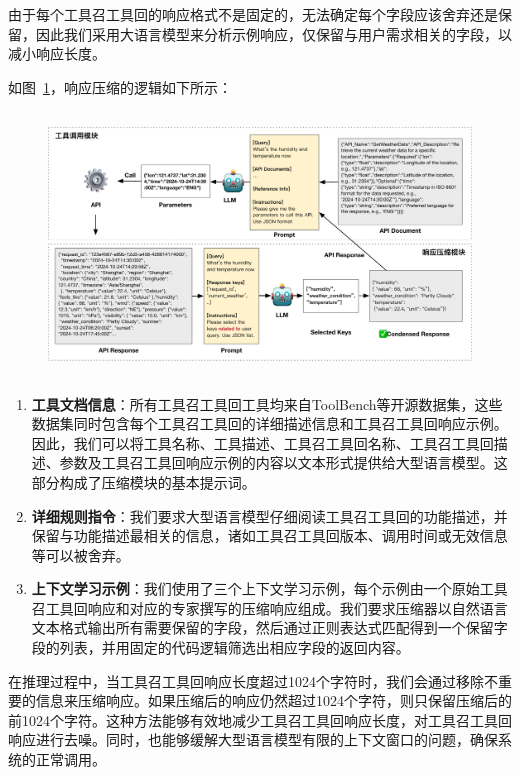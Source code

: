 由于每个工具召工具回的响应格式不是固定的，无法确定每个字段应该舍弃还是保留，因此我们采用大语言模型来分析示例响应，仅保留与用户需求相关的字段，以减小响应长度。

如图~\ref{fig:ch4-compression}，响应压缩的逻辑如下所示：

\begin{figure}[!htp]
  \vspace{1em}
  \centering
  \setlength{\abovecaptionskip}{10pt} %
  \includegraphics[height=7cm]{../assets/ch4-工具调用模块.pdf}
  \label{fig:ch4-compression}
\end{figure}

\begin{enumerate}
    \item \textbf{工具文档信息}：所有工具召工具回工具均来自ToolBench等开源数据集，这些数据集同时包含每个工具召工具回的详细描述信息和工具召工具回响应示例。因此，我们可以将工具名称、工具描述、工具召工具回名称、工具召工具回描述、参数及工具召工具回响应示例的内容以文本形式提供给大型语言模型。这部分构成了压缩模块的基本提示词。
    
    \item \textbf{详细规则指令}：我们要求大型语言模型仔细阅读工具召工具回的功能描述，并保留与功能描述最相关的信息，诸如工具召工具回版本、调用时间或无效信息等可以被舍弃。
    
    \item \textbf{上下文学习示例}：我们使用了三个上下文学习示例，每个示例由一个原始工具召工具回响应和对应的专家撰写的压缩响应组成。我们要求压缩器以自然语言文本格式输出所有需要保留的字段，然后通过正则表达式匹配得到一个保留字段的列表，并用固定的代码逻辑筛选出相应字段的返回内容。
\end{enumerate}

在推理过程中，当工具召工具回响应长度超过1024个字符时，我们会通过移除不重要的信息来压缩响应。如果压缩后的响应仍然超过1024个字符，则只保留压缩后的前1024个字符。这种方法能够有效地减少工具召工具回响应长度，对工具召工具回响应进行去噪。同时，也能够缓解大型语言模型有限的上下文窗口的问题，确保系统的正常调用。

